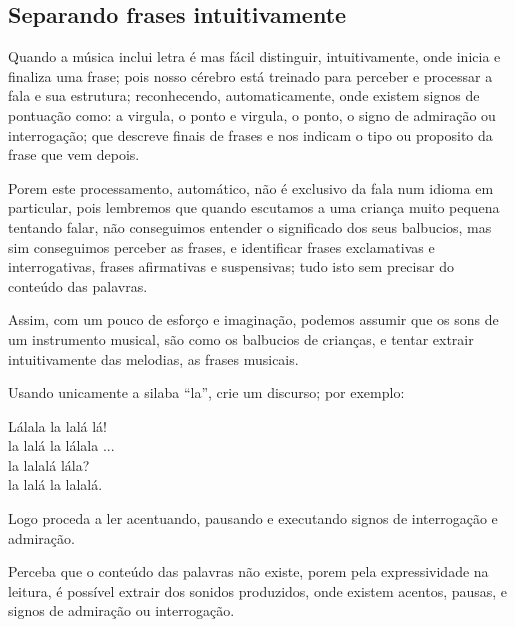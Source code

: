 \subsection{Separando frases intuitivamente}

Quando a música inclui letra é mas fácil distinguir, intuitivamente, 
onde inicia e finaliza uma frase;
pois nosso cérebro está treinado para perceber e processar a fala e sua estrutura;
reconhecendo, automaticamente,
onde existem signos de pontuação como:
a virgula, o ponto e virgula, o ponto, o signo de admiração ou interrogação;
que descreve finais de frases e nos indicam o tipo ou proposito da frase que vem depois.

Porem este processamento, automático, não é exclusivo da fala num idioma em particular,
pois lembremos que quando escutamos a uma criança muito pequena tentando falar,
não conseguimos entender o significado dos seus balbucios, 
mas sim conseguimos perceber as frases, 
e identificar frases exclamativas e interrogativas,
frases afirmativas e suspensivas;
tudo isto sem precisar do conteúdo das palavras.

Assim, com um pouco de esforço e imaginação,
podemos assumir que os sons de um instrumento musical, 
são como os balbucios de crianças, e tentar extrair intuitivamente das melodias,
as frases musicais. 
 

\begin{example}[O discurso de ``la'']
\label{ex:discrusodela}
Usando unicamente a silaba ``la'', crie um discurso; por exemplo:
\begin{citando}%
Lálala la lalá lá!\\
la lalá la lálala ...\\
la lalalá lála?\\
la lalá la lalalá.\\
\end{citando}%
Logo proceda a ler acentuando, pausando e
executando signos de interrogação e admiração.

Perceba que o conteúdo das palavras não existe, 
porem pela expressividade na leitura,
é possível extrair dos sonidos produzidos,
onde existem acentos, pausas, e signos de admiração ou interrogação.
\end{example}

